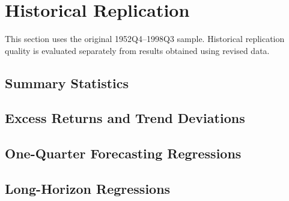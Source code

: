 \section{Historical Replication}

This section uses the original 1952Q4--1998Q3 sample. Historical replication
quality is evaluated separately from results obtained using revised data.

\subsection{Summary Statistics}
\HistoricalSummaryFinding


\subsection{Excess Returns and Trend Deviations}
\HistoricalFigureFinding


\subsection{One-Quarter Forecasting Regressions}
\HistoricalShortHorizonFinding


\subsection{Long-Horizon Regressions}
\HistoricalLongHorizonFinding

